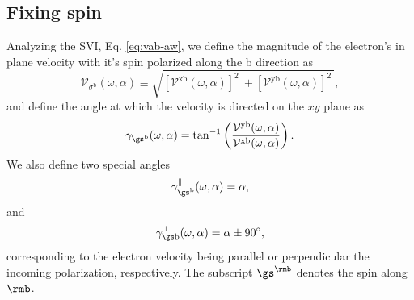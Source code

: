 \documentclass[prb,11pt,tightenlines,twocolumn,aps]{revtex4-1}
\begin{document}


\subsection{Fixing spin}\label{sec:theory-fixspin}

Analyzing the SVI, Eq. \eqref{eq:vab-aw}, we define the magnitude of
the electron's in plane
velocity with it's spin polarized along the $\mathrm{b}$ direction as
\begin{equation}
\mathcal{V}_{\sigma^{\mathrm{b}}}(\omega,\alpha)
\equiv
\sqrt{
[\mathcal{V}^{\mathrm{xb}}(\omega,\alpha)]^{2}\ +
[\mathcal{V}^{\mathrm{yb}}(\omega,\alpha)]^{2}\ 
}, 
\label{eq:vs-mag}
\end{equation}
and define the angle at which the velocity is directed on the $xy$ plane as
\begin{equation}
\gamma_{\gs^\mathrm{b}} (\omega,\alpha)
=
\tan^{-1} \left( \frac{\mathcal{V}^{\mathrm{yb}}(\omega,\alpha)}
{\mathcal{V}^{\mathrm{xb}}(\omega,\alpha)} \right)
.
\label{eq:gamma-ang}
\end{equation}
We also define two special angles
\begin{equation}
\gamma_{\gs^\mathrm{b}}^\parallel(\omega,\alpha) = \alpha, 
\label{eq:gamma-par} 
\end{equation}
and
\begin{equation}
\gamma_{\gs\mathrm{b}}^\perp(\omega,\alpha) = \alpha \pm 90^{\circ},
\label{eq:gamma-perp}
\end{equation}
corresponding to the electron velocity being parallel or perpendicular
the incoming polarization, 
respectively. The subscript $\gs^\rmb$ denotes the spin along $\rmb$.

\end{document}
